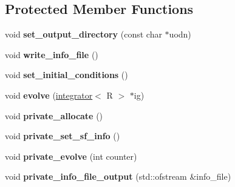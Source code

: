 \subsection*{Protected Member Functions}
\begin{DoxyCompactItemize}
\item 
\hypertarget{classmodel_a9d295f09eb260af90c184498422d2951}{
void {\bfseries set\_\-output\_\-directory} (const char $\ast$uodn)}
\label{classmodel_a9d295f09eb260af90c184498422d2951}

\item 
\hypertarget{classmodel_a2c46925e71c4af596e2e1ea55796d5fc}{
void {\bfseries write\_\-info\_\-file} ()}
\label{classmodel_a2c46925e71c4af596e2e1ea55796d5fc}

\item 
\hypertarget{classmodel_a26254dca4a7bb65302f8ac79ec7d880b}{
void {\bfseries set\_\-initial\_\-conditions} ()}
\label{classmodel_a26254dca4a7bb65302f8ac79ec7d880b}

\item 
\hypertarget{classmodel_a7205d404bf7eda6417fcb2162ad9baa7}{
void {\bfseries evolve} (\hyperlink{classintegrator}{integrator}$<$ R $>$ $\ast$ig)}
\label{classmodel_a7205d404bf7eda6417fcb2162ad9baa7}

\item 
\hypertarget{classmodel_a3d06bc461cb157407beea8e4fd3c1182}{
void {\bfseries private\_\-allocate} ()}
\label{classmodel_a3d06bc461cb157407beea8e4fd3c1182}

\item 
\hypertarget{classmodel_a2d7c0fefd194dc3220bd155d86ebf32a}{
void {\bfseries private\_\-set\_\-sf\_\-info} ()}
\label{classmodel_a2d7c0fefd194dc3220bd155d86ebf32a}

\item 
\hypertarget{classmodel_a2112bf622835919980b9dcad666420ba}{
void {\bfseries private\_\-evolve} (int counter)}
\label{classmodel_a2112bf622835919980b9dcad666420ba}

\item 
\hypertarget{classmodel_ae729d9cc3fa9b3733523236f300e0ceb}{
void {\bfseries private\_\-info\_\-file\_\-output} (std::ofstream \&info\_\-file)}
\label{classmodel_ae729d9cc3fa9b3733523236f300e0ceb}

\end{DoxyCompactItemize}

